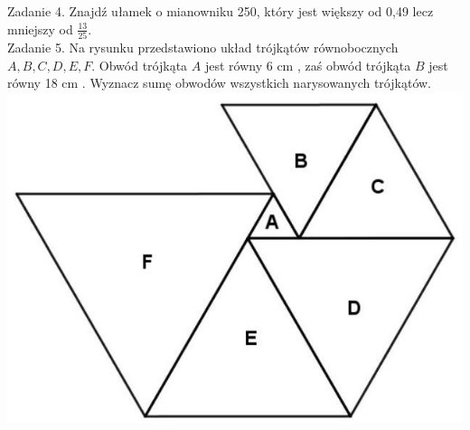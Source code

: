 \documentclass[10pt]{article}
\begin{document}
Zadanie 4. Znajdź ułamek o mianowniku 250, który jest większy od 0,49 lecz mniejszy od \(\frac{13}{25}\).\\
Zadanie 5. Na rysunku przedstawiono układ trójkątów równobocznych \(A, B, C, D, E, F\). Obwód trójkąta \(A\) jest równy 6 cm , zaś obwód trójkąta \(B\) jest równy 18 cm . Wyznacz sumę obwodów wszystkich narysowanych trójkątów.\\
\includegraphics[max width=\textwidth, center]{2024_11_21_c870d62e3507162d8375g-1(1)}
\end{document}
